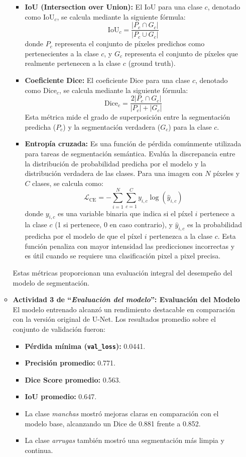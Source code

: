 \begin{enumerate}
\begin{itemize}
\begin{itemize}
  \item \textbf{IoU (Intersection over Union):} El IoU para una clase $c$, denotado como $\text{IoU}_c$, se calcula mediante la siguiente fórmula:
$$\text{IoU}_c = \frac{|P_c \cap G_c|}{|P_c \cup G_c|}$$
donde $P_c$ representa el conjunto de píxeles predichos como pertenecientes a la clase $c$, y $G_c$ representa el conjunto de píxeles que realmente pertenecen a la clase $c$ (ground truth).

  \item \textbf{Coeficiente Dice:} El coeficiente Dice para una clase $c$, denotado como $\text{Dice}_c$, se calcula mediante la siguiente fórmula:
$$\text{Dice}_c = \frac{2|P_c \cap G_c|}{|P_c| + |G_c|}$$
Esta métrica mide el grado de superposición entre la segmentación predicha ($P_c$) y la segmentación verdadera ($G_c$) para la clase $c$.
 

  \item \textbf{Entropía cruzada:} Es una función de pérdida comúnmente utilizada para tareas de segmentación semántica. Evalúa la discrepancia entre la distribución de probabilidad predicha por el modelo y la distribución verdadera de las clases. Para una imagen con $N$ píxeles y $C$ clases, se calcula como:
$$\mathcal{L}_{\text{CE}} = -\sum_{i=1}^{N} \sum_{c=1}^{C} y_{i,c} \log(\hat{y}_{i,c})$$
donde $y_{i,c}$ es una variable binaria que indica si el píxel $i$ pertenece a la clase $c$ (1 si pertenece, 0 en caso contrario), y $\hat{y}_{i,c}$ es la probabilidad predicha por el modelo de que el píxel $i$ pertenezca a la clase $c$. Esta función penaliza con mayor intensidad las predicciones incorrectas y es útil cuando se requiere una clasificación pixel a pixel precisa.
\end{itemize}

Estas métricas proporcionan una evaluación integral del desempeño del modelo de segmentación.



  \item\textbf{Actividad 3 de “\textit{Evaluación del modelo}”: Evaluación del Modelo}
  \\
  El modelo entrenado alcanzó un rendimiento destacable en comparación con la versión original de U-Net. Los resultados promedio sobre el conjunto de validación fueron:

\begin{itemize}
\item \textbf{Pérdida mínima (\texttt{val\_loss}):} 0.0441.
\item \textbf{Precisión promedio:} 0.771.
\item \textbf{Dice Score promedio:} 0.563.
\item \textbf{IoU promedio:} 0.647.
\item La clase \emph{manchas} mostró mejoras claras en comparación con el modelo base, alcanzando un Dice de 0.881 frente a 0.852.
\item La clase \emph{arrugas} también mostró una segmentación más limpia y continua.


\end{itemize}
\end{itemize}
\end{enumerate}
